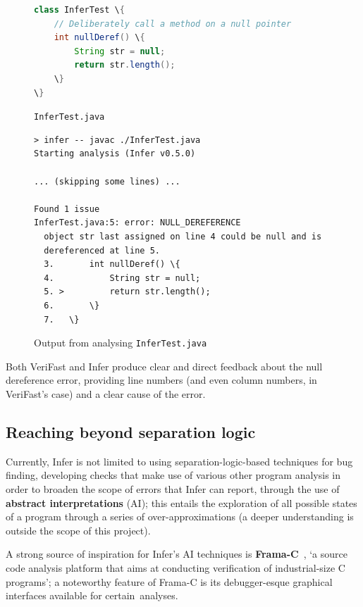 \begin{figure}
    \centering
    \begin{lstlisting}[language=Java,
        style=code,
        xleftmargin=0.2\textwidth,
        xrightmargin=0.2\textwidth]
class InferTest \{
    // Deliberately call a method on a null pointer
    int nullDeref() \{
        String str = null;
        return str.length();
    \}
\}
    \end{lstlisting}
    \caption{\texttt{InferTest.java}}\label{fig:infer-example}
\end{figure}

\begin{figure}
    \centering
    \begin{lstlisting}[style=terminal,
        xleftmargin=0.05\textwidth,
        xrightmargin=0.05\textwidth]
> infer -- javac ./InferTest.java
Starting analysis (Infer v0.5.0)

... (skipping some lines) ...

Found 1 issue
InferTest.java:5: error: NULL_DEREFERENCE
  object str last assigned on line 4 could be null and is
  dereferenced at line 5.
  3.       int nullDeref() \{
  4.           String str = null;
  5. >         return str.length();
  6.       \}
  7.   \}
    \end{lstlisting}
    \caption{Output from analysing \texttt{InferTest.java}}\label{fig:infer-example-output}
\end{figure}

Both VeriFast and Infer produce clear and direct feedback about the null
dereference error, providing line numbers (and even column numbers, in
VeriFast's case) and a clear cause of the error.

\subsection{Reaching beyond separation logic}

Currently, Infer is not limited to using separation-logic-based techniques for
bug finding, developing checks that make use of various other program analysis
in order to broaden the scope of errors that Infer can report, through the use
of \textbf{abstract interpretations} (AI); this entails the exploration of all
possible states of a program through a series of over-approximations (a deeper
understanding is outside the scope of this project).

A strong source of inspiration for Infer's AI techniques is
\textbf{Frama-C}~\cite{frama-c-paper, frama-c-site}, `a source code analysis
platform that aims at conducting verification of industrial-size C programs'; a
noteworthy feature of Frama-C is its debugger-esque graphical interfaces
available for certain~analyses.


